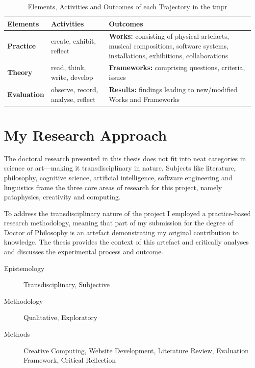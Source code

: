 \begin{table}[htb]
  \begin{tabu}{X[1]X[2]X[3]}
  \toprule
  \textbf{Elements}
  &
  \textbf{Activities}
  &
  \textbf{Outcomes}
  \\ \midrule
  \textbf{Practice}
  &
  create, exhibit, reflect
  &
  \textbf{Works:} consisting of physical artefacts, musical compositions, software systems, installations, exhibitions, collaborations
  \\ \midrule
  \textbf{Theory}
  &
  read, think, write, develop
  &
  \textbf{Frameworks:} comprising questions, criteria, issues
  \\ \midrule
  \textbf{Evaluation}
  &
  observe, record, analyse, reflect
  &
  \textbf{Results:} findings leading to new/modified Works and Frameworks
  \\ \bottomrule
  \end{tabu}
\caption[Elements, Activities and Outcomes of the \gls{tmpr}]{Elements, Activities and Outcomes of each Trajectory in the \gls{tmpr}}
\label{tab:tmpr}
\end{table}


\section{My Research Approach}
\label{s:mymeth}


The doctoral research presented in this thesis does not fit into neat categories in science or art---making it transdisciplinary in nature. Subjects like literature, philosophy, cognitive science, artificial intelligence, software engineering and linguistics frame the three core areas of research for this project, namely pataphysics, creativity and computing.

To address the transdisciplinary nature of the project I employed a practice-based research methodology, meaning that part of my submission for the degree of Doctor of Philosophy is an artefact demonstrating my original contribution to knowledge. The thesis provides the context of this artefact and critically analyses and discusses the experimental process and outcome.

\begin{description}
  \item [Epistemology] Transdisciplinary, Subjective
  \item [Methodology] Qualitative, Exploratory
  \item [Methods] Creative Computing, Website Development, Literature Review, Evaluation Framework, Critical Reflection
\end{description}

